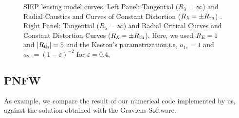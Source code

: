 \begin{figure}[!ht]
\caption{\label{siep_curves}  SIEP lensing model curves. Left Panel:
Tangential ($R_\lambda=\infty$) and Radial Caustics and Curves of Constant
Distortion ($R_\lambda=\pm R_{\rm th}$) . Right Panel: Tangential
($R_\lambda=\infty$) and Radial Critical Curves and  Constant Distortion Curves
($R_\lambda=\pm R_{\rm th}$). Here, we used $R_{\rm E}=1$ and $|R_{\rm
th}|=5$ and the Keeton's parametrization,i.e,  $a_{1\varepsilon}=1$ and
$a_{2\varepsilon}=(1-\varepsilon)^{-2}$ for $\varepsilon=0.4$, }
\end{figure}

\subsection{PNFW}
As example, we compare the result of our numerical code implemented by us,
against the solution obtained with the Gravlens Software.


